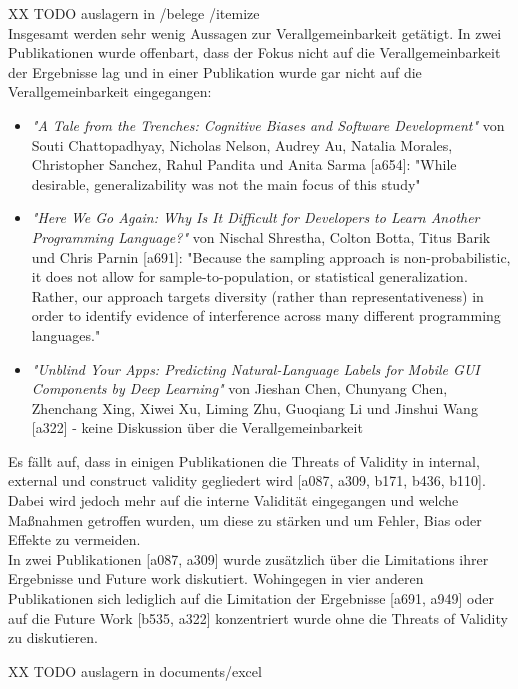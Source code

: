 \clearpage

XX TODO auslagern in /belege /itemize \\
Insgesamt werden sehr wenig Aussagen zur Verallgemeinbarkeit getätigt. In zwei Publikationen wurde offenbart, dass der Fokus nicht auf die Verallgemeinbarkeit der Ergebnisse lag und in einer Publikation wurde gar nicht auf die Verallgemeinbarkeit eingegangen:
\begin{itemize}
    \item \textit{"A Tale from the Trenches: Cognitive Biases and Software Development"} von Souti Chattopadhyay, Nicholas Nelson, Audrey Au, Natalia Morales, Christopher Sanchez, Rahul Pandita und Anita Sarma [a654]: "While desirable, generalizability was not the main focus of this study"
    \item \textit{"Here We Go Again: Why Is It Difficult for Developers to Learn Another Programming Language?"} von Nischal Shrestha, Colton Botta, Titus Barik und Chris Parnin [a691]: "Because the sampling approach is non-probabilistic, it does not allow for sample-to-population, or statistical generalization. Rather, our approach targets diversity (rather than representativeness) in order to identify evidence of interference across many different programming languages."
    \item \textit{"Unblind Your Apps: Predicting Natural-Language Labels for Mobile GUI Components by Deep Learning"} von Jieshan Chen, Chunyang Chen, Zhenchang Xing, Xiwei Xu, Liming Zhu, Guoqiang Li und Jinshui Wang [a322] - keine Diskussion über die Verallgemeinbarkeit
\end{itemize}

Es fällt auf, dass in einigen Publikationen die Threats of Validity in internal, external und construct validity gegliedert wird [a087, a309, b171, b436, b110]. Dabei wird jedoch mehr auf die interne Validität eingegangen und welche Maßnahmen getroffen wurden, um diese zu stärken und um Fehler, Bias oder Effekte zu vermeiden. \\
In zwei Publikationen [a087, a309] wurde zusätzlich über die Limitations ihrer Ergebnisse und Future work diskutiert. 
Wohingegen in vier anderen Publikationen sich lediglich auf die Limitation der Ergebnisse [a691, a949] oder auf die Future Work [b535, a322] konzentriert wurde ohne die Threats of Validity zu diskutieren.

XX TODO auslagern in documents/excel \\

